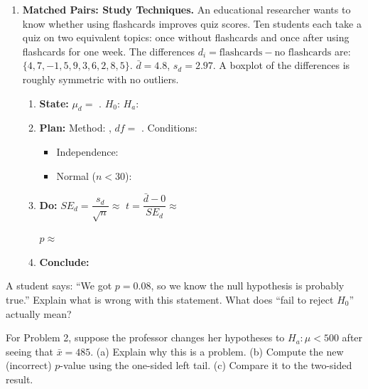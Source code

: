 \documentclass[10pt]{article}
\begin{document}
\begin{enumerate}
\begin{enumerate}[label=\alph*.]
        $p$ (two-sided) $\approx 2 \times \texttt{tcdf}($\blank{3cm}, $10^{99}$, \blank{2cm}$) \approx$ \blank{2cm}

  \item \textbf{Conclude:} 
\end{enumerate}

\vspace{0.08in}

\item \textbf{Matched Pairs: Study Techniques.} \quad
An educational researcher wants to know whether using flashcards improves quiz scores.
Ten students each take a quiz on two equivalent topics: once without flashcards and once
after using flashcards for one week. The differences $d_i = \text{flashcards} - \text{no flashcards}$
are: $\{4, 7, -1, 5, 9, 3, 6, 2, 8, 5\}$. \quad $\bar d = 4.8$, $s_d = 2.97$.
A boxplot of the differences is roughly symmetric with no outliers.

\begin{enumerate}[label=\alph*.]
  \item \textbf{State:} $\mu_d = $ \blank{6cm}. \quad $H_0$: \blank{3cm} \quad $H_a$: \blank{3cm}
  \item \textbf{Plan:} Method: \blank{5cm}, $df = $ \blank{1.5cm}. Conditions:
        \begin{itemize}
          \item Independence: \writeline
          \item Normal ($n < 30$): \writeline
        \end{itemize}
  \item \textbf{Do:} $SE_d = \dfrac{s_d}{\sqrt{n}} \approx$ \blank{2.5cm} \quad
        $t = \dfrac{\bar d - 0}{SE_d} \approx$ \blank{2.5cm}

        $p \approx$ \blank{4cm}

  \item \textbf{Conclude:} 
\end{enumerate}

\end{enumerate}

\begin{reflectionbox}
A student says: ``We got $p = 0.08$, so we know the null hypothesis is probably true.''
Explain what is wrong with this statement. What does ``fail to reject $H_0$'' actually mean?
\end{reflectionbox}

\begin{extensionbox}
For Problem 2, suppose the professor changes her hypotheses to $H_a: \mu < 500$ after seeing
that $\bar x = 485$. (a) Explain why this is a problem. (b) Compute the new (incorrect)
$p$-value using the one-sided left tail. (c) Compare it to the two-sided result.
\end{extensionbox}
\end{document}
